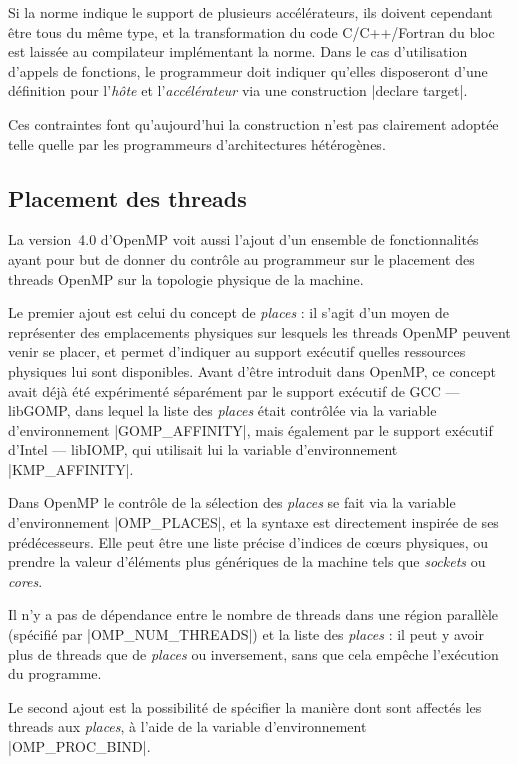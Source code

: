 Si la norme indique le support de plusieurs accélérateurs, ils doivent cependant être tous du même type, et la transformation du code C/C++/Fortran du bloc est laissée au compilateur implémentant la norme.
Dans le cas d'utilisation d'appels de fonctions, le programmeur doit indiquer qu'elles disposeront d'une définition pour l'\emph{hôte} et l'\emph{accélérateur} via une construction |declare target|.

Ces contraintes font qu'aujourd'hui la construction n'est pas clairement adoptée telle quelle par les programmeurs d'architectures hétérogènes.

\subsection{Placement des threads}

La version~4.0 d'OpenMP voit aussi l'ajout d'un ensemble de fonctionnalités ayant pour but de donner du contrôle au programmeur sur le placement des threads OpenMP sur la topologie physique de la machine.

Le premier ajout est celui du concept de \emph{places} : il s'agit d'un moyen de représenter des emplacements physiques sur lesquels les threads OpenMP peuvent venir se placer, et permet d'indiquer au support exécutif quelles ressources physiques lui sont disponibles.
Avant d'être introduit dans OpenMP, ce concept avait déjà été expérimenté séparément par le support exécutif de GCC --- libGOMP, dans lequel la liste des \emph{places} était contrôlée via la variable d'environnement |GOMP_AFFINITY|, mais également par le support exécutif d'Intel --- libIOMP, qui utilisait lui la variable d'environnement |KMP_AFFINITY|.

Dans OpenMP le contrôle de la sélection des \emph{places} se fait via la variable d'environnement |OMP_PLACES|, et la syntaxe est directement inspirée de ses prédécesseurs.
Elle peut être une liste précise d'indices de cœurs physiques, ou prendre la valeur d'éléments plus génériques de la machine tels que \emph{sockets} ou \emph{cores}.

Il n'y a pas de dépendance entre le nombre de threads dans une région parallèle (spécifié par |OMP_NUM_THREADS|) et la liste des \emph{places} : il peut y avoir plus de threads que de \emph{places} ou inversement, sans que cela empêche l'exécution du programme.

Le second ajout est la possibilité de spécifier la manière dont sont affectés les threads aux \emph{places}, à l'aide de la variable d'environnement |OMP_PROC_BIND|.


